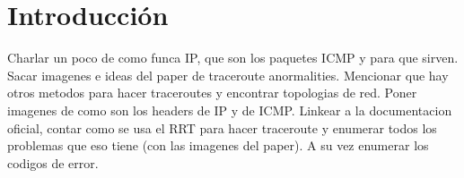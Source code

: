 \section{Introducción}

Charlar un poco de como funca IP, que son los paquetes ICMP y para que sirven. Sacar imagenes e ideas del paper de traceroute anormalities. Mencionar que hay otros metodos para hacer traceroutes y encontrar topologias de red. Poner imagenes de como son los headers de IP y de ICMP. Linkear a la documentacion oficial, contar como se usa el RRT para hacer traceroute y enumerar todos los problemas que eso tiene (con las imagenes del paper). A su vez enumerar los codigos de error.